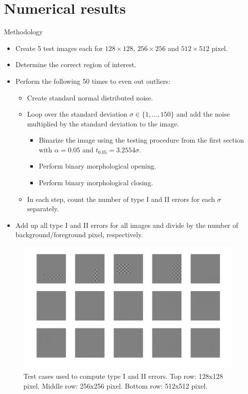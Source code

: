 \documentclass{beamer}
\begin{document}
\section{Numerical results}

\begin{frame}
	Methodology
	\begin{itemize}
		\item Create 5 test images each for $128 \times 128$, $256 \times 256$ and $512 \times 512$ pixel.
		\item Determine the correct region of interest.
		\item Perform the following 50 times to even out outliers:
		\begin{itemize}
			\item Create standard normal distributed noise.
			\item Loop over the standard deviation $\sigma \in \{ 1, \dots, 150 \}$ and add the noise multiplied by the standard deviation to the image.
			\begin{itemize}
				\item Binarize the image using the testing procedure from the first section with $\alpha = 0.05$ and $t_{0.05} = 3.2554 \sigma$.
				\item Perform binary morphological opening.
				\item Perform binary morphological closing.
			\end{itemize}
			\item In each step, count the number of type I and II errors for each $\sigma$ separately.
		\end{itemize}
		\item Add up all type I and II errors for all images and divide by the number of background/foreground pixel, respectively.
	\end{itemize}
\end{frame}

\begin{frame}
	\begin{figure}[h]
		\includegraphics[width=\linewidth]{Morphology/TestCases}
		\caption[Test cases]{Test cases used to compute type I and II errors. Top row: 128x128 pixel. Middle row: 256x256 pixel. Bottom row: 512x512 pixel.}
		\label{fig:TestCases}
	\end{figure}
\end{frame}
\end{document}
